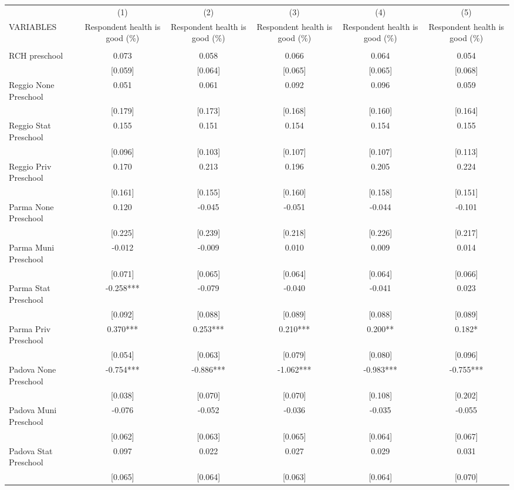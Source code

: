 \begin{tabular}{lccccc} \hline
 & (1) & (2) & (3) & (4) & (5) \\
VARIABLES & Respondent health is good (\%) & Respondent health is good (\%) & Respondent health is good (\%) & Respondent health is good (\%) & Respondent health is good (\%) \\ \hline
 &  &  &  &  &  \\
RCH preschool & 0.073 & 0.058 & 0.066 & 0.064 & 0.054 \\
 & [0.059] & [0.064] & [0.065] & [0.065] & [0.068] \\
Reggio None Preschool & 0.051 & 0.061 & 0.092 & 0.096 & 0.059 \\
 & [0.179] & [0.173] & [0.168] & [0.160] & [0.164] \\
Reggio Stat Preschool & 0.155 & 0.151 & 0.154 & 0.154 & 0.155 \\
 & [0.096] & [0.103] & [0.107] & [0.107] & [0.113] \\
Reggio Priv Preschool & 0.170 & 0.213 & 0.196 & 0.205 & 0.224 \\
 & [0.161] & [0.155] & [0.160] & [0.158] & [0.151] \\
Parma None Preschool & 0.120 & -0.045 & -0.051 & -0.044 & -0.101 \\
 & [0.225] & [0.239] & [0.218] & [0.226] & [0.217] \\
Parma Muni Preschool & -0.012 & -0.009 & 0.010 & 0.009 & 0.014 \\
 & [0.071] & [0.065] & [0.064] & [0.064] & [0.066] \\
Parma Stat Preschool & -0.258*** & -0.079 & -0.040 & -0.041 & 0.023 \\
 & [0.092] & [0.088] & [0.089] & [0.088] & [0.089] \\
Parma Priv Preschool & 0.370*** & 0.253*** & 0.210*** & 0.200** & 0.182* \\
 & [0.054] & [0.063] & [0.079] & [0.080] & [0.096] \\
Padova None Preschool & -0.754*** & -0.886*** & -1.062*** & -0.983*** & -0.755*** \\
 & [0.038] & [0.070] & [0.070] & [0.108] & [0.202] \\
Padova Muni Preschool & -0.076 & -0.052 & -0.036 & -0.035 & -0.055 \\
 & [0.062] & [0.063] & [0.065] & [0.064] & [0.067] \\
Padova Stat Preschool & 0.097 & 0.022 & 0.027 & 0.029 & 0.031 \\
 & [0.065] & [0.064] & [0.063] & [0.064] & [0.070] \\

\end{tabular}
